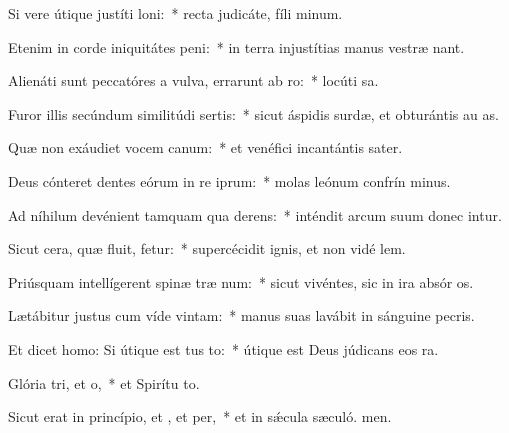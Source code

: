 \item Si vere útique justíti loni:~* recta judicáte, fíli minum.
\item Etenim in corde iniquitátes peni:~* in terra injustítias manus vestræ nant.
\item Alienáti sunt peccatóres a vulva, errarunt ab ro:~* locúti  sa.
\item Furor illis secúndum similitúdi sertis:~* sicut áspidis surdæ, et obturántis au as.
\item Quæ non exáudiet vocem canum:~* et venéfici incantántis sater.
\item Deus cónteret dentes eórum in re iprum:~* molas leónum confrín minus.
\item Ad níhilum devénient tamquam qua derens:~* inténdit arcum suum donec intur.
\item Sicut cera, quæ fluit, fetur:~* supercécidit ignis, et non vidé lem.
\item Priúsquam intellígerent spinæ træ num:~* sicut vivéntes, sic in ira absór os.
\item Lætábitur justus cum víde vintam:~* manus suas lavábit in sánguine pecris.
\item Et dicet homo: Si útique est tus to:~* útique est Deus júdicans eos  ra.
\item Glória tri, et o,~* et Spirítu to.
\item Sicut erat in princípio, et , et per,~* et in sǽcula sæculó. men.
